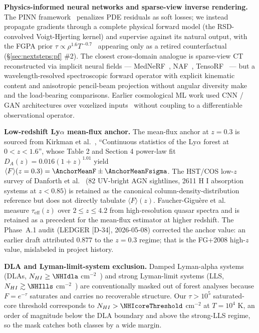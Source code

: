 \textbf{Physics-informed neural networks and sparse-view inverse rendering.} The PINN framework~\cite{raissi2019pinn, karniadakis2021pinns} penalizes PDE residuals as soft losses; we instead propagate gradients through a complete physical forward model (the RSD-convolved Voigt-Hjerting kernel) and supervise against its natural output, with the FGPA prior $\tau \propto \rho^{1.6} T^{-0.7}$~\cite{bi_davidsen1997, hui_gnedin1997} appearing only as a retired counterfactual (\S\ref{sec:nextsteps:pf} \#2). The closest cross-domain analogue is sparse-view CT reconstructed via implicit neural fields --- MedNeRF~\cite{corona2022mednerf}, NAF~\cite{zha2022naf}, TensoRF~\cite{chen2022tensorf} --- but a wavelength-resolved spectroscopic forward operator with explicit kinematic content and anisotropic pencil-beam projection without angular diversity make \cite{stark2015tomography} and \cite{horowitz2019tardis} the load-bearing comparisons. Earlier cosmological ML work used CNN / GAN architectures over voxelized inputs~\cite{zamudio2019higan, ravanbakhsh2017cosmology} without coupling to a differentiable observational operator.

\textbf{Low-redshift Ly$\alpha$ mean-flux anchor.} The mean-flux anchor at $z = 0.3$ is sourced from Kirkman et al.~\cite{kirkman2007}, ``Continuous statistics of the Ly$\alpha$ forest at $0 < z < 1.6$'', whose Table 2 and Section 4 power-law fit $D_A(z) = 0.016(1+z)^{1.01}$ yield $\langle F\rangle(z=0.3) = \AnchorMeanF \pm \AnchorMeanFsigma$. The HST/COS low-$z$ survey of Danforth et al.~\cite{danforth2016} (82 UV-bright AGN sightlines, 2611 H I absorption systems at $z < 0.85$) is retained as the canonical column-density-distribution reference but does not directly tabulate $\langle F\rangle(z)$. Faucher-Gigu\`ere et al.~\cite{faucher2008meanflux} measure $\tau_{\text{eff}}(z)$ over $2 \leq z \leq 4.2$ from high-resolution quasar spectra and is retained as a precedent for the mean-flux estimator at higher redshift. The Phase~A.1 audit (LEDGER [D-34], 2026-05-08) corrected the anchor value: an earlier draft attributed $0.877$ to the $z=0.3$ regime; that is the FG+2008 high-$z$ value, mislabeled in project history.

\textbf{DLA and Lyman-limit-system exclusion.} Damped Lyman-alpha systems (DLAs, $N_{HI} \geq \NHIdla$ cm$^{-2}$~\cite{wolfe2005}) and strong Lyman-limit systems (LLS, $N_{HI} \gtrsim \NHIlls$ cm$^{-2}$~\cite{prochaska2010}) are conventionally masked out of forest analyses because $F = e^{-\tau}$ saturates and carries no recoverable structure. Our $\tau > 10^5$ saturated-core threshold corresponds to $N_{HI} > \NHIcoreThreshold$ cm$^{-2}$ at $T = 10^4$ K, an order of magnitude below the DLA boundary and above the strong-LLS regime, so the mask catches both classes by a wide margin.

